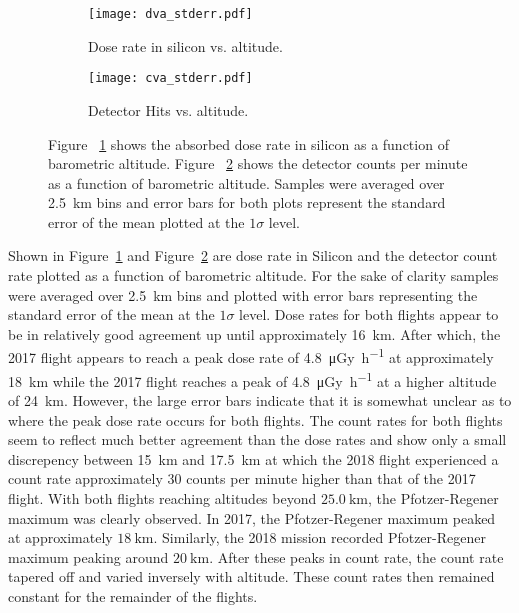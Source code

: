\begin{figure}[H]
\centering
\begin{subfigure}{.5\textwidth}
  \centering
  \texttt{[image: dva\_stderr.pdf]}
  \caption{Dose rate in silicon vs. altitude.}
  \label{fig:sub1}
\end{subfigure}%
\begin{subfigure}{.5\textwidth}
  \centering
  \texttt{[image: cva\_stderr.pdf]}
  \caption{Detector Hits vs. altitude.}
  \label{fig:sub2}
\end{subfigure}
\caption{Figure ~\ref{fig:sub1} shows the absorbed dose rate in silicon as a function of barometric altitude.  Figure ~\ref{fig:sub2} shows the detector counts per minute as a function of barometric altitude. Samples were averaged over \SI{2.5}{\kilo\meter} bins and error bars for both plots represent the standard error of the mean plotted at the $1\sigma$ level.}
\label{fig:dose-count-subplots}
\end{figure}
Shown in Figure~\ref{fig:sub1} and Figure~\ref{fig:sub2} are dose rate in Silicon and the detector count rate plotted as a function of barometric altitude. For the sake of clarity samples were averaged over \SI{2.5}{\kilo\meter} bins and plotted with error bars representing the standard error of the mean at the $1\sigma$ level. Dose rates for both flights appear to be in relatively good agreement up until approximately \SI{16}{\kilo\meter}. After which, the 2017 flight appears to reach a peak dose rate of \SI{4.8}{\micro\gray\per\hour} at approximately \SI{18}{\kilo\meter} while the 2017 flight reaches a peak of \SI{4.8}{\micro\gray\per\hour} at a higher altitude of \SI{24}{\kilo\meter}. However, the large error bars indicate that it is somewhat unclear as to where the peak dose rate occurs for both flights. The count rates for both flights seem to reflect much better agreement than the dose rates and show only a small discrepency between \SI{15}{\kilo\meter} and \SI{17.5}{\kilo\meter} at which the 2018 flight experienced a count rate approximately 30 counts per minute higher than that of the 2017 flight. With both flights reaching altitudes beyond $\SI{25.0}{\kilo\meter}$, the Pfotzer-Regener maximum was clearly observed.  In 2017, the Pfotzer-Regener maximum peaked at approximately  $\SI{18}{\kilo\meter}$.  Similarly, the 2018 mission recorded Pfotzer-Regener maximum peaking around $\SI{20}{\kilo\meter}$. After these peaks in count rate, the count rate tapered off and varied inversely with altitude.  These count rates then remained constant for the remainder of the flights.

